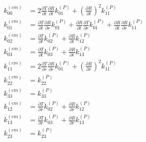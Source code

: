 \documentclass[10pt,letterpaper]{article}
\begin{document}
\begin{align}
k^{(cm)}_{00} &= 2 \frac{\partial T}{\partial t} \frac{\partial R}{\partial t} k^{(P)}_{01} + \left(\frac{\partial R}{\partial t}\right)^2 k^{(P)}_{11}\nonumber\\
k^{(cm)}_{01} &=\frac{\partial T}{\partial t} \frac{\partial R}{\partial r} k^{(P)}_{01}+\frac{\partial R}{\partial t} \frac{\partial T}{\partial r} k^{(P)}_{01}+\frac{\partial R}{\partial t} \frac{\partial R}{\partial r} k^{(P)}_{11} \nonumber\\
k^{(cm)}_{02} &= \frac{\partial T}{\partial t} k^{(P)}_{02}+\frac{\partial R}{\partial t} k^{(P)}_{12} \nonumber\\
k^{(cm)}_{03} &= \frac{\partial T}{\partial t} k^{(P)}_{03}+\frac{\partial R}{\partial t} k^{(P)}_{13} \nonumber\\
k^{(cm)}_{11} &=2 \frac{\partial T}{\partial r} \frac{\partial R}{\partial r} k^{(P)}_{01}+\left(\frac{\partial R}{\partial r}\right)^2 k^{(P)}_{11} \nonumber\\
k^{(cm)}_{22} &= k^{(P)}_{22}\nonumber\\
k^{(cm)}_{33} &= k^{(P)}_{33}\nonumber\\
k^{(cm)}_{12} &= \frac{\partial T}{\partial r} k^{(P)}_{02}+\frac{\partial R}{\partial r} k^{(P)}_{12} \nonumber\\
k^{(cm)}_{13} &= \frac{\partial T}{\partial r} k^{(P)}_{03}+\frac{\partial R}{\partial r} k^{(P)}_{13} \nonumber\\
k^{(cm)}_{23} &= k^{(P)}_{23}
\end{align}
\end{document}
